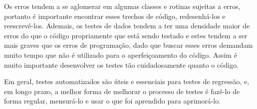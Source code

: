 \documentclass[12pt, a4paper]{article}
\begin{document}
    Os erros tendem a se aglomerar em algumas classes e rotinas sujeitas a erros, portanto é importante encontrar esses trechos de código, redesenhá-los e reescrevê-los. Ademais, os testes de dados tendem a ter uma densidade maior de erros do que o código propriamente que está sendo testado e estes tendem a ser mais graves que os erros de programação, dado que buscar esses erros demandam muito tempo que não é utilizado para o aperfeiçoamento do código. Assim é muito importante desenvolver os testes tão cuidadosamente quanto o código.
    
    Em geral, testes automatizados são úteis e essenciais para testes de regressão, e, em longo prazo, a melhor forma de melhorar o processo de testes é fazê-lo de forma regular, mensurá-lo e usar o que foi aprendido para aprimorá-lo.
    
    
    
    
\end{document}
